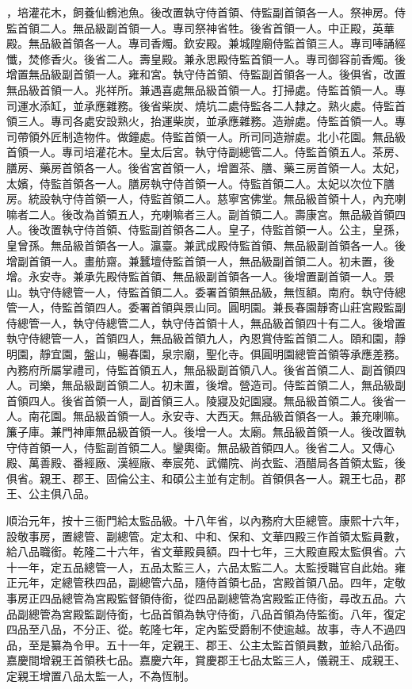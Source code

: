 \begin{pinyinscope}
，培灌花木，飼養仙鶴池魚。後改置執守侍首領、侍監副首領各一人。祭神房。侍監首領二人。無品級副首領一人。專司祭神省牲。後省首領一人。中正殿，英華殿。無品級首領各一人。專司香燭。欽安殿。兼城隍廟侍監首領三人。專司唪誦經懺，焚修香火。後省二人。壽皇殿。兼永思殿侍監首領一人。專司御容前香燭。後增置無品級副首領一人。雍和宮。執守侍首領、侍監副首領各一人。後俱省，改置無品級首領一人。兆祥所。兼遇喜處無品級首領一人。打掃處。侍監首領一人。專司運水添缸，並承應雜務。後省柴炭、燒坑二處侍監各二人隸之。熟火處。侍監首領三人。專司各處安設熟火，抬運柴炭，並承應雜務。造辦處。侍監首領一人。專司帶領外匠制造物件。做鐘處。侍監首領一人。所司同造辦處。北小花園。無品級首領一人。專司培灌花木。皇太后宮。執守侍副總管二人。侍監首領五人。茶房、膳房、藥房首領各一人。後省宮首領一人，增置茶、膳、藥三房首領一人。太妃，太嬪，侍監首領各一人。膳房執守侍首領一人。侍監首領二人。太妃以次位下膳房。統設執守侍首領一人，侍監首領二人。慈寧宮佛堂。無品級首領十人，內充喇嘛者二人。後改為首領五人，充喇嘛者三人。副首領二人。壽康宮。無品級首領四人。後改置執守侍首領、侍監副首領各二人。皇子，侍監首領一人。公主，皇孫，皇曾孫。無品級首領各一人。瀛臺。兼武成殿侍監首領、無品級副首領各一人。後增副首領一人。畫舫齋。兼蠶壇侍監首領一人，無品級副首領二人。初未置，後增。永安寺。兼承先殿侍監首領、無品級副首領各一人。後增置副首領一人。景山。執守侍總管一人，侍監首領二人。委署首領無品級，無恆額。南府。執守侍總管一人，侍監首領四人。委署首領與景山同。圓明園。兼長春園靜寄山莊宮殿監副侍總管一人，執守侍總管二人，執守侍首領十人，無品級首領四十有二人。後增置執守侍總管一人，首領四人，無品級首領九人，內恩賞侍監首領二人。頤和園，靜明園，靜宜園，盤山，暢春園，泉宗廟，聖化寺。俱圓明園總管首領等承應差務。內務府所屬掌禮司，侍監首領五人，無品級副首領八人。後省首領二人、副首領四人。司樂，無品級副首領二人。初未置，後增。營造司。侍監首領二人，無品級副首領四人。後省首領一人，副首領三人。陵寢及妃園寢。無品級首領二人。後省一人。南花園。無品級首領一人。永安寺、大西天。無品級首領各一人。兼充喇嘛。簾子庫。兼門神庫無品級首領一人。後增一人。太廟。無品級首領一人。後改置執守侍首領一人，侍監副首領二人。鑾輿衛。無品級首領四人。後省二人。又傳心殿、萬善殿、番經廠、漢經廠、奉宸苑、武備院、尚衣監、酒醋局各首領太監，後俱省。親王、郡王、固倫公主、和碩公主並有定制。首領俱各一人。親王七品，郡王、公主俱八品。

順治元年，按十三衙門給太監品級。十八年省，以內務府大臣總管。康熙十六年，設敬事房，置總管、副總管。定太和、中和、保和、文華四殿三作首領太監員數，給八品職銜。乾隆二十六年，省文華殿員額。四十七年，三大殿直殿太監俱省。六十一年，定五品總管一人，五品太監三人，六品太監二人。太監授職官自此始。雍正元年，定總管秩四品，副總管六品，隨侍首領七品，宮殿首領八品。四年，定敬事房正四品總管為宮殿監督領侍銜，從四品副總管為宮殿監正侍銜，尋改五品。六品副總管為宮殿監副侍銜，七品首領為執守侍銜，八品首領為侍監銜。八年，復定四品至八品，不分正、從。乾隆七年，定內監受爵制不使逾越。故事，寺人不過四品，至是纂為令甲。五十一年，定親王、郡王、公主太監首領員數，並給八品銜。嘉慶間增親王首領秩七品。嘉慶六年，賞慶郡王七品太監三人，儀親王、成親王、定親王增置八品太監一人，不為恆制。


\end{pinyinscope}
